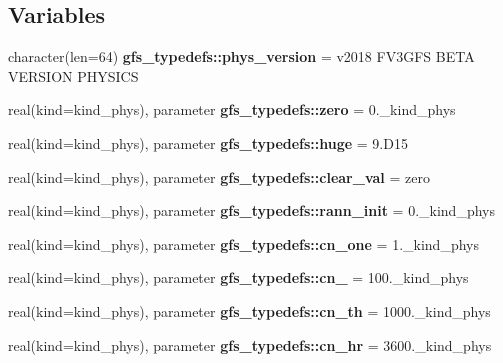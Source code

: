 \subsection*{Variables}
\begin{DoxyCompactItemize}
\item 
character(len=64) \textbf{ gfs\+\_\+typedefs\+::phys\+\_\+version} = \textquotesingle{}v2018 F\+V3\+G\+FS B\+E\+TA V\+E\+R\+S\+I\+ON P\+H\+Y\+S\+I\+CS\textquotesingle{}
\item 
real(kind=kind\+\_\+phys), parameter \textbf{ gfs\+\_\+typedefs\+::zero} = 0.\+\_\+kind\+\_\+phys
\item 
real(kind=kind\+\_\+phys), parameter \textbf{ gfs\+\_\+typedefs\+::huge} = 9.\+D15
\item 
real(kind=kind\+\_\+phys), parameter \textbf{ gfs\+\_\+typedefs\+::clear\+\_\+val} = zero
\item 
real(kind=kind\+\_\+phys), parameter \textbf{ gfs\+\_\+typedefs\+::rann\+\_\+init} = 0.\+\_\+kind\+\_\+phys
\item 
real(kind=kind\+\_\+phys), parameter \textbf{ gfs\+\_\+typedefs\+::cn\+\_\+one} = 1.\+\_\+kind\+\_\+phys
\item 
real(kind=kind\+\_\+phys), parameter \textbf{ gfs\+\_\+typedefs\+::cn\+\_} = 100.\+\_\+kind\+\_\+phys
\item 
real(kind=kind\+\_\+phys), parameter \textbf{ gfs\+\_\+typedefs\+::cn\+\_\+th} = 1000.\+\_\+kind\+\_\+phys
\item 
real(kind=kind\+\_\+phys), parameter \textbf{ gfs\+\_\+typedefs\+::cn\+\_\+hr} = 3600.\+\_\+kind\+\_\+phys
\end{DoxyCompactItemize}
